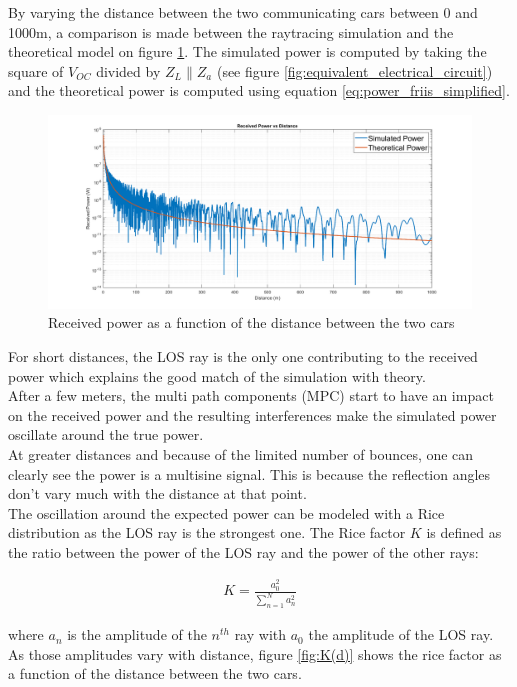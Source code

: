 \documentclass[10pt,a4paper]{ULBreport}
\begin{document}
By varying the distance between the two communicating cars between 0 and 1000m, a comparison is made between the raytracing simulation and the theoretical model on figure \ref{fig:P_RX(d)}. The simulated power is computed by taking the square of $V_{OC}$ divided by $Z_L \mathbin{\|} Z_a$ (see figure \ref{fig:equivalent_electrical_circuit}) and the theoretical power is computed using equation \ref{eq:power_friis_simplified}.

\begin{figure}[H]
    \centering
    \includegraphics[width=1\textwidth]{3_3.png}
    \caption{Received power as a function of the distance between the two cars}
    \label{fig:P_RX(d)}
\end{figure}

For short distances, the LOS ray is the only one contributing to the received power which explains the good match of the simulation with theory. \\
After a few meters, the multi path components (MPC) start to have an impact on the received power and the resulting interferences make the simulated power oscillate around the true power. \\
At greater distances and because of the limited number of bounces, one can clearly see the power is a multisine signal. This is because the reflection angles don't vary much with the distance at that point.\\

The oscillation around the expected power can be modeled with a Rice distribution as the LOS ray is the strongest one. The Rice factor $K$ is defined as the ratio between the power of the LOS ray and the power of the other rays:

\begin{align*}
    K = \frac{a_0^2}{\sum_{n=1}^{N}a_n^2}
\end{align*}

where $a_n$ is the amplitude of the $n^{th}$ ray with $a_0$ the amplitude of the LOS ray. As those amplitudes vary with distance, figure \ref{fig:K(d)} shows the rice factor as a function of the distance between the two cars. 
\end{document}

